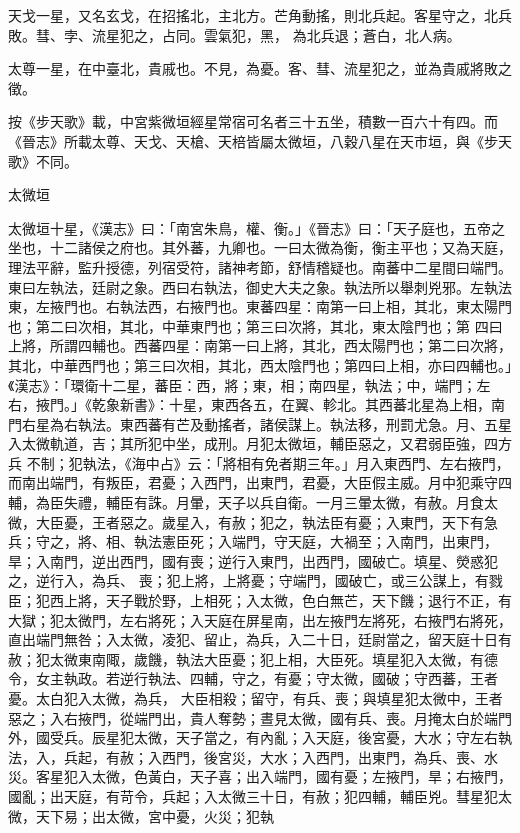 \begin{pinyinscope}
 天戈一星，又名玄戈，在招搖北，主北方。芒角動搖，則北兵起。客星守之，北兵敗。彗、孛、流星犯之，占同。雲氣犯，黑，
 為北兵退；蒼白，北人病。



 太尊一星，在中臺北，貴戚也。不見，為憂。客、彗、流星犯之，並為貴戚將敗之徵。



 按《步天歌》載，中宮紫微垣經星常宿可名者三十五坐，積數一百六十有四。而《晉志》所載太尊、天戈、天槍、天棓皆屬太微垣，八穀八星在天市垣，與《步天歌》不同。



 太微垣



 太微垣十星，《漢志》曰：「南宮朱鳥，權、衡。」《晉志》曰：「天子庭也，五帝之坐也，十二諸侯之府也。其外蕃，九卿也。一曰太微為衡，衡主平也；又為天庭，理法平辭，監升授德，列宿受符，諸神考節，舒情稽疑也。南蕃中二星間曰端門。東曰左執法，廷尉之象。西曰右執法，御史大夫之象。執法所以舉刺兇邪。左執法東，左掖門也。右執法西，右掖門也。東蕃四星：南第一曰上相，其北，東太陽門也；第二曰次相，其北，中華東門也；第三曰次將，其北，東太陰門也；第
 四曰上將，所謂四輔也。西蕃四星：南第一曰上將，其北，西太陽門也；第二曰次將，其北，中華西門也；第三曰次相，其北，西太陰門也；第四曰上相，亦曰四輔也。」《漢志》：「環衛十二星，蕃臣：西，將；東，相；南四星，執法；中，端門；左右，掖門。」《乾象新書》：十星，東西各五，在翼、軫北。其西蕃北星為上相，南門右星為右執法。東西蕃有芒及動搖者，諸侯謀上。執法移，刑罰尤急。月、五星入太微軌道，吉；其所犯中坐，成刑。月犯太微垣，輔臣惡之，又君弱臣強，四方兵
 不制；犯執法，《海中占》云：「將相有免者期三年。」月入東西門、左右掖門，而南出端門，有叛臣，君憂；入西門，出東門，君憂，大臣假主威。月中犯乘守四輔，為臣失禮，輔臣有誅。月暈，天子以兵自衛。一月三暈太微，有赦。月食太微，大臣憂，王者惡之。歲星入，有赦；犯之，執法臣有憂；入東門，天下有急兵；守之，將、相、執法憲臣死；入端門，守天庭，大禍至；入南門，出東門，旱；入南門，逆出西門，國有喪；逆行入東門，出西門，國破亡。填星、熒惑犯之，逆行入，為兵、
 喪；犯上將，上將憂；守端門，國破亡，或三公謀上，有戮臣；犯西上將，天子戰於野，上相死；入太微，色白無芒，天下饑；退行不正，有大獄；犯太微門，左右將死；入天庭在屏星南，出左掖門左將死，右掖門右將死，直出端門無咎；入太微，凌犯、留止，為兵，入二十日，廷尉當之，留天庭十日有赦；犯太微東南陬，歲饑，執法大臣憂；犯上相，大臣死。填星犯入太微，有德令，女主執政。若逆行執法、四輔，守之，有憂；守太微，國破；守西蕃，王者憂。太白犯入太微，為兵，
 大臣相殺；留守，有兵、喪；與填星犯太微中，王者惡之；入右掖門，從端門出，貴人奪勢；晝見太微，國有兵、喪。月掩太白於端門外，國受兵。辰星犯太微，天子當之，有內亂；入天庭，後宮憂，大水；守左右執法，入，兵起，有赦；入西門，後宮災，大水；入西門，出東門，為兵、喪、水災。客星犯入太微，色黃白，天子喜；出入端門，國有憂；左掖門，旱；右掖門，國亂；出天庭，有苛令，兵起；入太微三十日，有赦；犯四輔，輔臣兇。彗星犯太微，天下易；出太微，宮中憂，火災；犯執

\end{pinyinscope}
